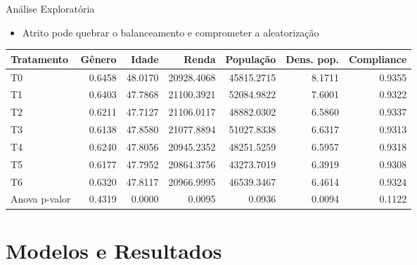 \documentclass[
  12pt,
  ignorenonframetext,
  aspectratio=169]{beamer}
\providecommand{\tightlist}{%
  \setlength{\itemsep}{0pt}\setlength{\parskip}{0pt}}
\begin{document}
\begin{frame}{Análise Exploratória}
\protect\hypertarget{anuxe1lise-exploratuxf3ria-1}{}
\begin{itemize}
\tightlist
\item
  Atrito pode quebrar o balanceamento e comprometer a aleatorização
\end{itemize}

\begin{table}[H]
\centering
\fontsize{8}{10}\selectfont
\begin{threeparttable}
\begin{tabular}[t]{lrrrrrr}
\toprule
Tratamento & Gênero & Idade & Renda & População & Dens. pop. & Compliance\\
\midrule
T0 & 0.6458 & 48.0170 & 20928.4068 & 45815.2715 & 8.1711 & 0.9355\\
T1 & 0.6403 & 47.7868 & 21100.3921 & 52084.9822 & 7.6001 & 0.9322\\
T2 & 0.6211 & 47.7127 & 21106.0117 & 48882.0302 & 6.5860 & 0.9337\\
T3 & 0.6138 & 47.8580 & 21077.8894 & 51027.8338 & 6.6317 & 0.9313\\
T4 & 0.6240 & 47.8056 & 20945.2352 & 48251.5259 & 6.5957 & 0.9318\\
\addlinespace
T5 & 0.6177 & 47.7952 & 20864.3756 & 43273.7019 & 6.3919 & 0.9308\\
T6 & 0.6320 & 47.8117 & 20966.9995 & 46539.3467 & 6.4614 & 0.9324\\
\midrule
Anova p-valor & 0.4319 & 0.0000 & 0.0095 & 0.0936 & 0.0094 & 0.1122\\
\bottomrule
\end{tabular}
\end{threeparttable}
\end{table}
\end{frame}

\hypertarget{modelos-e-resultados}{%
\section{Modelos e Resultados}\label{modelos-e-resultados}}
\end{document}
